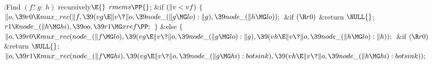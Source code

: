 \B{}:Find $(f{?}\ g{:}\ h)$ recursively\X${}\E{}$\6
$\\{rmems}\PP{}$;\6
\&{if} ${}(\|v<\\{vf}){}$\5
${}\{{}$\1\6
${}\|o,\39\\{r0}\K\\{mux\_rec}(\|f,\39(\\{vg}\E\|v\?\|o,\39\\{node\_}(\|g\MG%
\\{lo}):\|g),\39\\{node\_}(\|h\MG\\{lo}));{}$\6
\&{if} ${}(\R\\{r0}){}$\1\5
\&{return} ${}\NULL{}$;\2\6
${}\\{r1}\K\\{node\_}(\|h\MG\\{hi}),\39\\{oo},\39\\{r1}\MG\\{xref}\PP;{}$\6
\4${}\}{}$\2\6
\&{else}\5
${}\{{}$\1\6
${}\|o,\39\\{r0}\K\\{mux\_rec}(\\{node\_}(\|f\MG\\{lo}),\39(\\{vg}\E\|v\?\|o,%
\39\\{node\_}(\|g\MG\\{lo}):\|g),\39(\\{vh}\E\|v\?\|o,\39\\{node\_}(\|h\MG%
\\{lo}):\|h));{}$\6
\&{if} ${}(\R\\{r0}){}$\1\5
\&{return} ${}\NULL{}$;\2\6
${}\|o,\39\\{r1}\K\\{mux\_rec}(\\{node\_}(\|f\MG\\{hi}),\39(\\{vg}\E\|v\?\|o,%
\39\\{node\_}(\|g\MG\\{hi}):\\{botsink}),\39(\\{vh}\E\|v\?\|o,\39\\{node\_}(\|h%
\MG\\{hi}):\\{botsink}));{}$\6
